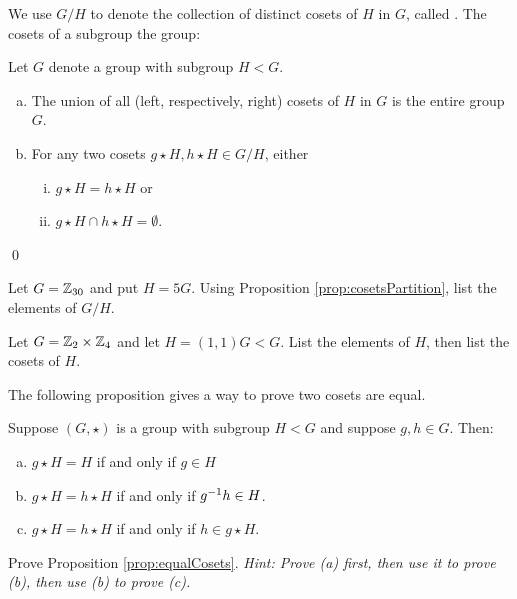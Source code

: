\documentclass[../algebraNotesMSRI-UP2016.tex]{subfiles}
\begin{document}
\begin{frame}
We use $G/H$ to denote the collection of distinct cosets of $H$ in $G$, called .  The cosets of a subgroup  the group:

\smallGap
\begin{prop}\label{prop:cosetsPartition}
Let $G$ denote a group with subgroup $H< G$.
\begin{enumerate}[(a)]
\item The union of all (left, respectively, right) cosets of $H$ in $G$ is the entire group $G$.
\item For any two cosets $g\star H,h\star H\in G/H$, either
\begin{enumerate}[(i)]
	\item $g\star H=h\star H$ or
	\item $g\star H\cap h\star H=\emptyset$.
\end{enumerate}
\end{enumerate}
\qed
\end{prop}
\end{frame}

\begin{frame}[c]
\begin{exe}[cf. Problem 66]\label{exe:prob66}
Let $G=\mathbb Z_{30}$ and put $H=5G$.  Using Proposition \ref{prop:cosetsPartition}, list the elements of $G/H$.  
\end{exe}

\smallGap
\begin{exe}[cf. Problem 67]\label{exe:prob67}
Let $G=\mathbb Z_2\times \mathbb Z_4$ and let $H=(1,1)G< G$.  List the elements of $H$, then list the cosets of $H$.
\end{exe}
\end{frame}

\begin{frame}
The following proposition gives a way to prove two cosets are equal.

\smallGap
\begin{prop}\label{prop:equalCosets}
Suppose $(G,\star)$ is a group with subgroup $H< G$ and suppose $g,h\in G$.  Then:
\begin{enumerate}[(a)]
\item $g\star H=H$ if and only if $g\in H$
\item $g\star H=h\star H$ if and only if $g^{-1}h\in H$.
\item $g\star H=h\star H$ if and only if $h\in g\star H$.
\end{enumerate}
\end{prop}

\smallGap
\begin{exe}[cf. Problem 68]\label{exe:prob68}
Prove Proposition \ref{prop:equalCosets}.  \textit{Hint: Prove (a) first, then use it to prove (b), then use (b) to prove (c).}
\end{exe}
\end{frame}
\end{document}
